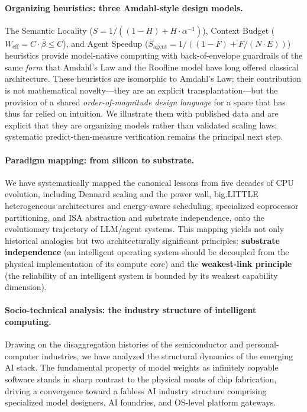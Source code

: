 \paragraph{Organizing heuristics: three Amdahl-style design models.}
The Semantic Locality ($S = 1/((1-H) + H \cdot \alpha^{-1})$), Context Budget ($W_{\mathrm{eff}} = C \cdot \bar{\beta} \leq C$), and Agent Speedup ($S_{\mathrm{agent}} = 1/((1-F) + F/(N \cdot E))$) heuristics provide model-native computing with back-of-envelope guardrails of the same \emph{form} that Amdahl's Law and the Roofline model have long offered classical architecture. These heuristics are isomorphic to Amdahl's Law; their contribution is not mathematical novelty---they are an explicit transplantation---but the provision of a shared \emph{order-of-magnitude design language} for a space that has thus far relied on intuition. We illustrate them with published data and are explicit that they are organizing models rather than validated scaling laws; systematic predict-then-measure verification remains the principal next step.

\paragraph{Paradigm mapping: from silicon to substrate.}
We have systematically mapped the canonical lessons from five decades of CPU evolution, including Dennard scaling and the power wall, big.LITTLE heterogeneous architectures and energy-aware scheduling, specialized coprocessor partitioning, and ISA abstraction and substrate independence, onto the evolutionary trajectory of LLM/agent systems. This mapping yields not only historical analogies but two architecturally significant principles: \textbf{substrate independence} (an intelligent operating system should be decoupled from the physical implementation of its compute core) and the \textbf{weakest-link principle} (the reliability of an intelligent system is bounded by its weakest capability dimension).

\paragraph{Socio-technical analysis: the industry structure of intelligent computing.}
Drawing on the disaggregation histories of the semiconductor and personal-computer industries, we have analyzed the structural dynamics of the emerging AI stack. The fundamental property of model weights as infinitely copyable software stands in sharp contrast to the physical moats of chip fabrication, driving a convergence toward a fabless AI industry structure comprising specialized model designers, AI foundries, and OS-level platform gateways.

